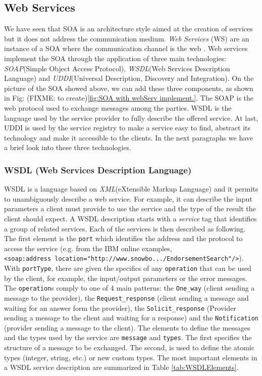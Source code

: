 \subsection{Web Services}
\label{WebServices}
We have seen that SOA is an architecture style aimed at the creation of services but it does not address the communication medium. \textit{Web Services} (WS) are an instance of a SOA where the communication channel is the web \cite{Pernici04}.
Web services implement the SOA through the application of three main technologies: \textit{SOAP}(Simple Object Access Protocol), \textit{WSDL}(Web Services Description Language) and \textit{UDDI}(Universal Description, Discovery and Integration).
On the picture of the SOA showed above, we can add these three components, as shown in Fig: (FIXME: to create)\ref{fig:SOA with webServ implement.}. The SOAP is the web protocol used to exchange messages among the parties. WSDL is the language used by the service provider to fully describe the offered service. At last, UDDI is used by the service registry to make a service easy to find, abstract its technology and make it accessible to the clients.
In the next paragraphs we have a brief look into these three technologies.

\subsubsection{WSDL (Web Services Description Language) }
\label{Wsdl}
WSDL is a language based on \textit{XML}(eXtensible Markup Language) and it permits to unambiguously describe a web service. For example, it can describe the input parameters a client must provide to use the service and the type of the result the client should expect. 
A WSDL description starts with a \textit{service} tag that identifies a group of related services. Each of the services is then described as following.
The first element is the \verb|port| which identifies the address and the protocol to access the service (e.g. from the IBM online examples,\cite{IBMWSDL} \\
\verb|<soap:address location="http://www.snowbo.../EndorsementSearch"/>|). \\
With \verb|portType|, there are given the specifics of any \verb|operation| that can be used by the client, for example, the input/output parameters or the error messages. The \verb|operation|s comply to one of 4 main patterns: the \verb|One_way| (client sending a message to the provider), the \verb|Request_response| (client sending a message and waiting for an answer form the provider), the \verb|Solicit_response| (Provider sending a message to the client and waiting for a response) and the \verb|Notification| (provider sending a message to the client).
The elements to define the messages and the types used by the service are \verb|message| and \verb|types|. The first specifies the structure of a message to be exchanged. The second, is used to define the atomic types (integer, string, etc.) or new custom types. 
The most important elements in a WSDL service description are summarized in Table \ref{tab:WSDLElements}.


